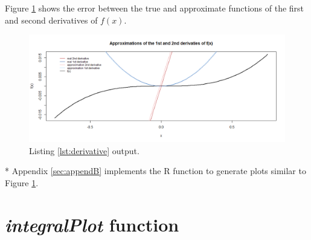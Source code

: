 \documentclass[11pt,a4paper]{article}
\begin{document}
Figure \ref{fig:plotderivs} shows the error between the true and approximate functions of the first and second derivatives of $ f(x) $.

\begin{figure}[!h]
\centering
\includegraphics[width=\textwidth]{./img/1and2_derivatives.png}
\caption{Listing \ref{lst:derivative} output.\label{fig:plotderivs}}
\end{figure}

* Appendix \ref{sec:appendB} implements the R function to generate plots similar to Figure \ref{fig:plotderivs}.


\clearpage
\printbibliography

\appendix %

\clearpage

\section{\emph{integralPlot} function}\label{sec:appendA}
\end{document}
